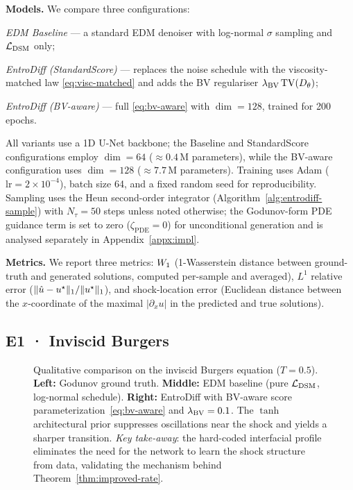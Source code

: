 \textbf{Models.} We compare three configurations:
\begin{enumerate*}[label=(\roman*)]
  \item \emph{EDM Baseline} — a standard {EDM} denoiser
    \citep{karras2022edm} with log-normal $\sigma$ sampling and $\mathcal{L}_{\mathrm{DSM}}$
    only;
  \item \emph{EntroDiff (StandardScore)} — replaces the noise schedule with
    the viscosity-matched law \eqref{eq:visc-matched} and adds the {BV}
    regulariser $\lambda_{\mathrm{BV}}\,\mathrm{TV}(D_{\theta})$;
  \item \emph{EntroDiff (BV-aware)} — full \eqref{eq:bv-aware} with
    $\dim=128$, trained for 200 epochs.
\end{enumerate*}
All variants use a 1D U-Net backbone; the Baseline and StandardScore
configurations employ $\dim=64$ ($\approx 0.4$\,M parameters), while
the {BV}-aware configuration uses $\dim=128$ ($\approx 7.7$\,M parameters). Training uses Adam
($\mathrm{lr}=2\times10^{-4}$), batch size 64, and a fixed random seed for
reproducibility. Sampling uses the Heun second-order integrator
(Algorithm~\ref{alg:entrodiff-sample}) with $N_{\tau}=50$ steps unless noted
otherwise; the Godunov-form {PDE} guidance term is set to zero
($\zeta_{\mathrm{PDE}}=0$) for unconditional generation and is analysed
separately in Appendix~\ref{appx:impl}.

\textbf{Metrics.} We report three metrics:
$W_{1}$ (1-Wasserstein distance between ground-truth and generated
solutions, computed per-sample and averaged), $L^{1}$ relative error
($\lVert \hat u - u^{\star} \rVert_{1}/\lVert u^{\star} \rVert_{1}$), and shock-location
error (Euclidean distance between the $x$-coordinate of the maximal
$|\partial_{x}u|$ in the predicted and true solutions).

\subsection{E1 · Inviscid Burgers}
\label{sec:exp:e1}

\begin{figure}[t]
    \centering
    \fbox{\rule[-.5cm]{0cm}{3.5cm} \rule[-.5cm]{\textwidth}{0cm}}
    \caption{Qualitative comparison on the inviscid Burgers equation
      ($T=0.5$). \textbf{Left:} Godunov ground truth.
      \textbf{Middle:} EDM baseline (pure $\mathcal{L}_{\mathrm{DSM}}$, log-normal schedule).
      \textbf{Right:} EntroDiff with {BV}-aware score parameterization~\eqref{eq:bv-aware}
      and $\lambda_{\mathrm{BV}}=0.1$. The $\tanh$ architectural prior suppresses
      oscillations near the shock and yields a sharper transition.
      \emph{Key take-away}: the hard-coded interfacial profile eliminates
      the need for the network to learn the shock structure from data,
      validating the mechanism behind Theorem~\ref{thm:improved-rate}.}
    \label{fig:e1-burgers}
\end{figure}

